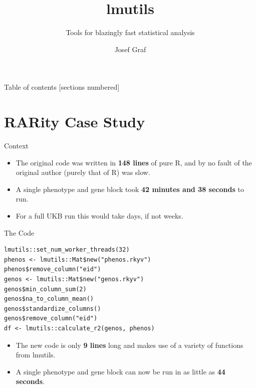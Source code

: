 \documentclass[10pt,handout]{beamer}
\title{lmutils}
\subtitle{Tools for blazingly fast statistical analysis}
\date{}
\author{Josef Graf}
\institute{McMaster University}
\begin{document}
\maketitle

\begin{frame}{Table of contents}
  [sections numbered]
  \tableofcontents%
\end{frame}

\section[RARity Case Study]{RARity Case Study}

\begin{frame}{Context}
  \begin{itemize}[<+->]
    \item The original code was written in \textbf{148 lines} of pure R,
      and by no fault of the original author (purely that of R) was slow.
    \item A single phenotype and gene block took
      \textbf{42 minutes and 38 seconds} to run.
    \item For a full UKB run this would take days, if not weeks.
  \end{itemize}
\end{frame}

\begin{frame}[fragile]{The Code}
\begin{verbatim}
lmutils::set_num_worker_threads(32)
phenos <- lmutils::Mat$new("phenos.rkyv")
phenos$remove_column("eid")
genos <- lmutils::Mat$new("genos.rkyv")
genos$min_column_sum(2)
genos$na_to_column_mean()
genos$standardize_columns()
genos$remove_column("eid")
df <- lmutils::calculate_r2(genos, phenos)
\end{verbatim}
  \begin{itemize}
    \item<2-> The new code is only \textbf{9 lines} long and makes
      use of a variety of functions from lmutils.
    \item<3-> A single phenotype and gene block can now be run in
      as little as \textbf{44 seconds}.
  \end{itemize}
\end{frame}
\end{document}
